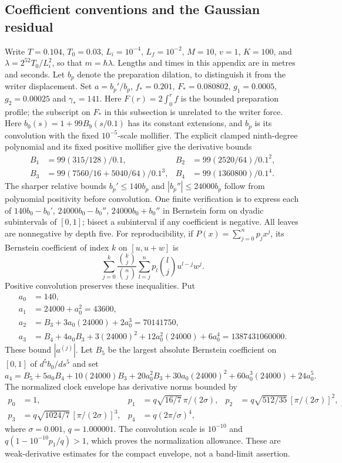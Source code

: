 \documentclass[11pt]{article}
\theoremstyle{definition}\newtheorem{definition}[theorem]{Definition}
\theoremstyle{remark}\newtheorem{remark}[theorem]{Remark}
\begin{document}
\subsection{Coefficient conventions and the Gaussian residual}
Write $T=0.104$, $T_0=0.03$, $L_i=10^{-4}$, $L_f=10^{-2}$,
$M=10$, $v=1$, $K=100$, and $\lambda=2^{52}T_0/L_i^2$, so that
$m=\hbar\lambda$. Lengths and times in this appendix are in metres and
seconds. Let $b_p$ denote the preparation dilation, to distinguish it
from the writer displacement. Set $a=b_p'/b_p$, $f_*=0.201$,
$F_*=0.080802$, $g_1=0.0005$, $g_2=0.00025$ and $\gamma_*=141$.
Here $F(r)=2\int_0^r f$ is the bounded preparation profile; the subscript
on $F_*$ in this subsection is unrelated to the writer force.
Here $b_0(s)=1+99B_9(s/0.1)$ has its constant extensions, and
$b_p$ is its convolution with the fixed $10^{-5}$-scale mollifier.
The explicit clamped ninth-degree polynomial and its fixed positive
mollifier give the derivative bounds
\begin{align}
 B_1&=99(315/128)/0.1,& B_2&=99(2520/64)/0.1^2,\\
 B_3&=99(7560/16+5040/64)/0.1^3,&
 B_4&=99(1360800)/0.1^4. \label{prep:bjets}
\end{align}
The sharper relative bounds $b_p'\le140b_p$ and
$|b_p''|\le24000b_p$ follow from polynomial positivity before
convolution. One finite verification is to express each of
$140b_0-b_0'$, $24000b_0-b_0''$, $24000b_0+b_0''$ in Bernstein
form on dyadic subintervals of $[0,1]$; bisect a subinterval if any
coefficient is negative. All leaves are nonnegative by depth five.
For reproducibility, if $P(x)=\sum_{j=0}^n p_jx^j$, its Bernstein
coefficient of index $k$ on $[u,u+w]$ is
\[
 \sum_{j=0}^k\frac{\binom{k}{j}}{\binom{n}{j}}
 \sum_{l=j}^n p_l\binom{l}{j}u^{l-j}w^j.
\]
Positive convolution preserves these inequalities. Put
\begin{align}
 a_0&=140,\\
 a_1&=24000+a_0^2=43600,\\
 a_2&=B_3+3a_0(24000)+2a_0^3=70141750,\\
 a_3&=B_4+4a_0B_3+3(24000)^2+12a_0^2(24000)+6a_0^4
       =1387431060000. \label{prep:ajets}
\end{align}
These bound $|a^{(j)}|$. Let $B_5$ be the largest absolute Bernstein
coefficient on $[0,1]$ of $d^5b_0/ds^5$ and set
\[
 a_4=B_5+5a_0B_4+10(24000)B_3+20a_0^2B_3
       +30a_0(24000)^2+60a_0^3(24000)+24a_0^5.
\]
The normalized clock envelope has derivative norms bounded by
\begin{align*}
 p_0&=1,&p_1&=q\sqrt{16/7}\,\pi/(2\sigma),&
 p_2&=q\sqrt{512/35}\,[\pi/(2\sigma)]^2,\\
 p_3&=q\sqrt{1024/7}\,[\pi/(2\sigma)]^3,&
 p_4&=q(2\pi/\sigma)^4,
\end{align*}
where $\sigma=0.001$, $q=1.000001$. The convolution scale is
$10^{-10}$ and $q(1-10^{-10}p_1/q)>1$, which proves the normalization
allowance. These are weak-derivative estimates for the compact envelope,
not a band-limit assertion.
\end{document}

